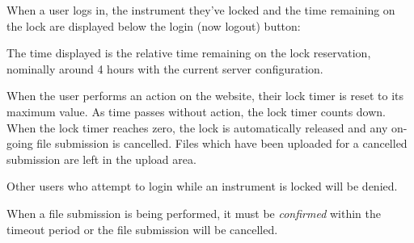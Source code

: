 \documentclass[letterpaper,10pt,english]{sphinxmanual}
\begin{document}
When a user logs in,  the instrument they've locked and the time remaining on the
lock are displayed below the login (now logout) button:
\begin{figure}[htbp]
\centering

\end{figure}

The time displayed is the relative time remaining on the lock reservation,  nominally
around 4 hours with the current server configuration.

When the user performs an action on the website,  their lock timer is reset to its maximum value.
As time passes without action,  the lock timer counts down.  When the lock timer reaches zero,
the lock is automatically released and any on-going file submission is cancelled.   Files which
have been uploaded for a cancelled submission are left in the upload area.

Other users who attempt to login while an instrument is locked will be denied.

When a file submission is being performed,  it must be \emph{confirmed} within the timeout period
or the file submission will be cancelled.
\end{document}
